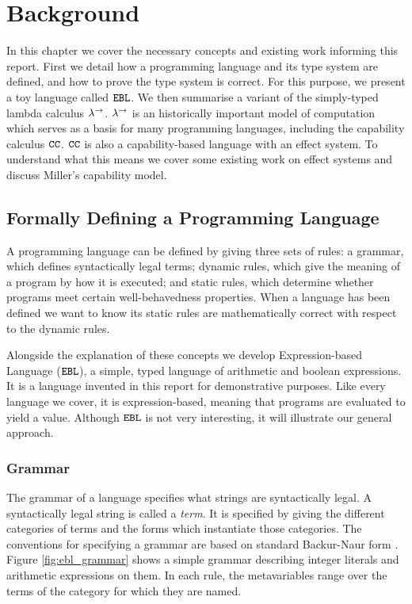 \chapter{Background}\label{C:background}

In this chapter we cover the necessary concepts and existing work informing this report. First we detail how a programming language and its type system are defined, and how to prove the type system is correct. For this purpose, we present a toy language called $\mathtt{EBL}$. We then summarise a variant of the simply-typed lambda calculus $\lambda^{\rightarrow}$. $\lambda^{\rightarrow}$ is an historically important model of computation which serves as a basis for many programming languages, including the capability calculus $\mathtt{CC}$. $\mathtt{CC}$ is also a capability-based language with an effect system. To understand what this means we cover some existing work on effect systems and discuss Miller's capability model.

\section{Formally Defining a Programming Language}

A programming language can be defined by giving three sets of rules: a grammar, which defines syntactically legal terms; dynamic rules, which give the meaning of a program by how it is executed; and static rules, which determine whether programs meet certain well-behavedness properties. When a language has been defined we want to know its static rules are mathematically correct with respect to the dynamic rules.

Alongside the explanation of these concepts we develop Expression-based Language ($\mathtt{EBL}$), a simple, typed language of arithmetic and boolean expressions. It is a language invented in this report for demonstrative purposes. Like every language we cover, it is expression-based, meaning that programs are evaluated to yield a value. Although $\mathtt{EBL}$ is not very interesting, it will illustrate our general approach.

\subsection{Grammar}

The grammar of a language specifies what strings are syntactically legal. A syntactically legal string is called a \textit{term}. It is specified by giving the different categories of terms and the forms which instantiate those categories. The conventions for specifying a grammar are based on standard Backur-Naur form \cite{bnf}. Figure \ref{fig:ebl_grammar} shows a simple grammar describing integer literals and arithmetic expressions on them. In each rule, the metavariables range over the terms of the category for which they are named.

